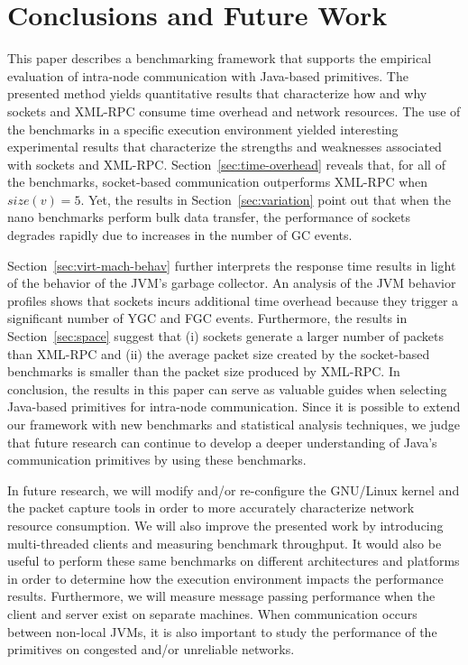\documentclass{sig-alternate}
\begin{document}

\vspace*{-.1in}
\section{Conclusions and Future Work}
\label{sec:conclusions}

This paper describes a benchmarking framework that supports the
empirical evaluation of intra-node communication with Java-based
primitives.  The presented method yields quantitative results that
characterize how and why sockets and XML-RPC consume time overhead and
network resources.  The use of the benchmarks in a specific execution
environment yielded interesting experimental results that characterize
the strengths and weaknesses associated with sockets and XML-RPC.
Section~\ref{sec:time-overhead} reveals that, for all of the
benchmarks, socket-based communication outperforms XML-RPC when
$size(v)=5$.  Yet, the results in Section~\ref{sec:variation} point
out that when the nano benchmarks perform bulk data transfer, the
performance of sockets degrades rapidly due to increases in the number
of GC events.


Section~\ref{sec:virt-mach-behav} further interprets the response time
results in light of the behavior of the JVM's garbage collector.  An
analysis of the JVM behavior profiles shows that sockets incurs
additional time overhead because they trigger a significant number of
YGC and FGC events.  Furthermore, the results in
Section~\ref{sec:space} suggest that (i) sockets generate a larger
number of packets than XML-RPC and (ii) the average packet size
created by the socket-based benchmarks is smaller than the packet size
produced by XML-RPC.  In conclusion, the results in this paper can
serve as valuable guides when selecting Java-based primitives for
intra-node communication.  Since it is possible to extend our
framework with new benchmarks and statistical analysis techniques, we
judge that future research can continue to develop a deeper
understanding of Java's communication primitives by using these
benchmarks.

In future research, we will modify and/or re-configure the GNU/Linux
kernel and the packet capture tools in order to more accurately
characterize network resource consumption.  We will also improve the
presented work by introducing multi-threaded clients and measuring
benchmark throughput.  It would also be useful to perform these same
benchmarks on different architectures and platforms in order to
determine how the execution environment impacts the performance
results.  Furthermore, we will measure message passing performance
when the client and server exist on separate machines.  When
communication occurs between non-local JVMs, it is also important to
study the performance of the primitives on congested and/or unreliable
networks.
\end{document}
